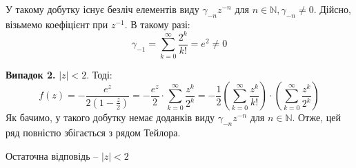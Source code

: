 \documentclass[14pt]{extarticle}
\begin{document}
У такому добутку існує безліч елементів виду $\gamma_{-n}z^{-n}$ для $n \in \mathbb{N}, \gamma_{-n} \neq 0$. Дійсно, візьмемо коефіцієнт при $z^{-1}$. В такому разі:
\[
\gamma_{-1} = \sum_{k=0}^{\infty} \frac{2^k}{k!} = e^2 \neq 0
\]

\textbf{Випадок 2.} $|z|<2$. Тоді:
\[
f(z) = -\frac{e^z}{2(1-\frac{z}{2})} = -\frac{e^z}{2} \cdot \sum_{k=0}^{\infty} \frac{z^k}{2^k} = -\frac{1}{2} \left(\sum_{k=0}^{\infty}\frac{z^k}{k!}\right) \cdot \left(\sum_{k=0}^{\infty}\frac{z^k}{2^k}\right)
\]
Як бачимо, у такого добутку немає доданків виду $\gamma_{-n}z^{-n}$ для $n \in \mathbb{N}$. Отже, цей ряд повністю збігається з рядом Тейлора. 

Остаточна відповідь -- $\boxed{|z|<2}$
\end{document}
